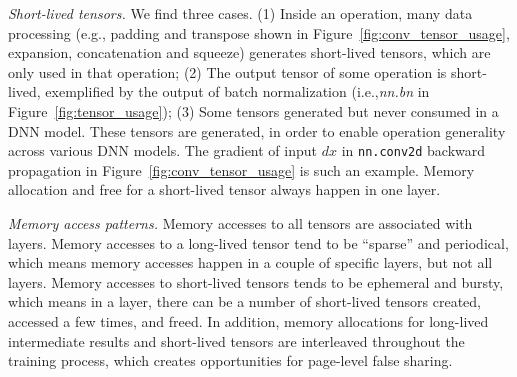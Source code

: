 \textcolor{check}{\textit{Short-lived tensors.}
We find three cases. (1) Inside an operation, many data processing (e.g., padding and transpose shown in Figure~\ref{fig:conv_tensor_usage}, expansion, concatenation and squeeze) generates short-lived tensors, which are only used in that operation; (2) The output tensor of some operation is short-lived, exemplified by the output of batch normalization (i.e.,\textit{nn.bn} in Figure~\ref{fig:tensor_usage}); (3) Some tensors generated but never consumed in a DNN model. These tensors are generated, in order to enable operation generality across various DNN models. The gradient of input $dx$ in \texttt{nn.conv2d} backward propagation in Figure~\ref{fig:conv_tensor_usage} is such an example.  Memory allocation and free for a short-lived tensor always happen in one layer.}

\textcolor{check}{\textit{Memory access patterns.}
Memory accesses to all tensors are associated with layers. Memory accesses to a long-lived tensor tend to be ``sparse'' and periodical, which means memory accesses happen in a couple of specific layers, but not all layers. Memory accesses to short-lived tensors tends to be ephemeral and bursty, which means
in a layer, there can be a number of short-lived tensors created, accessed a few times, and freed. In addition, memory allocations for long-lived  intermediate results and short-lived tensors are interleaved throughout the training process, which creates opportunities for page-level false sharing.}





